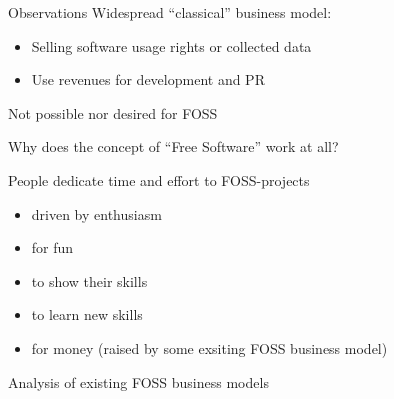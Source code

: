 \documentclass[t]{beamer}
\begin{document}

\begin{frame}[label=obs2]{Observations}
Widespread ``classical'' business model:
\begin{itemize}
 \item Selling software usage rights or collected data
 \item Use revenues for development and PR
\end{itemize}
\pause
\smallskip
Not possible nor desired for FOSS

\pause
\medskip

{Why does the concept of ``Free Software'' work at all?}

\bigskip
People dedicate time and effort to FOSS-projects
\begin{itemize}
 \item driven by enthusiasm
 \item for fun
 \item to show their skills
 \item to learn new skills
 \bigskip

 \pause
 \item for money (raised by some exsiting FOSS business model)
\end{itemize}


\end{frame}


\begin{frame}[label=ol30]{}

\vspace{0.3\textheight}
\LARGE
\begin{center}
  Analysis of existing FOSS business models
\end{center}

\end{frame}

\end{document}
